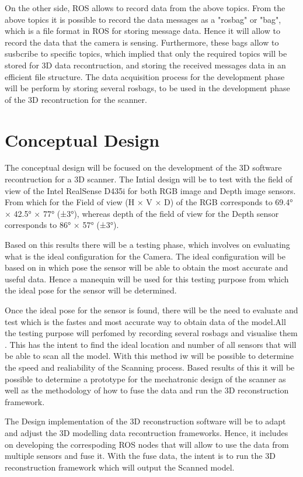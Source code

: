 \documentclass[12pt]{report}
\begin{document}
On the other side, ROS allows to record data from the above topics. From the above topics it is possible to record the data messages as a "rosbag" or "bag", which is a file format in ROS for storing message data. Hence it will allow to record the data that the camera is sensing. 
Furthermore, these bags allow to susbcribe to specific topics, which implied that only the required topics will be stored for 3D data recontruction, and storing the received messages data in an efficient file structure. 
The data acquisition process for the development phase will be perform by storing several rosbags, to be used in the development phase of the 3D recontruction for the scanner.

\section{Conceptual Design}
The conceptual design will be focused on the  development of the 3D software recontruction for a 3D scanner. 
The Intial design will be to test with the field of view of the Intel RealSense D435i for both RGB image and Depth image sensors. From which for the Field of view (H × V × D) of the RGB corresponds to 69.4° × 42.5° × 77° (±3°),
whereas depth of the field of view for the Depth sensor corresponds to 86° × 57° (±3°)\citep*{intelrealsense}.

Based on this results there will be a testing phase, which involves on evaluating what is the ideal configuration for the Camera. The ideal configuration will be based on in which pose the sensor will be able to obtain the most accurate and useful data. 
Hence a manequin will be used for this testing purpose from which the ideal pose for the sensor will be determined. 
\enlargethispage{\baselineskip}

Once the ideal pose for the sensor is found, there will be the need to evaluate and test which is the fastes and most accurate way to obtain data of the model.All the testing purpose will perfomed by recording several rosbags and visualise them .
This has the intent to find the ideal location and number of all sensors that will be able to scan all the model. With this method iw will be possible to determine the speed and realiability of the Scanning process. 
Based results of this it will be possible to determine a prototype for the mechatronic design of the scanner as well as the methodology of how to fuse the data and run the 3D reconstruction framework. 

The Design implementation of the 3D reconstruction software will be to adapt and adjust the 3D modelling data recontruction frameworks. Hence, it includes on developing the correspoding ROS nodes that will allow to use the data from multiple sensors and fuse it. 
With the fuse data, the intent is to run the 3D reconstruction framework which will output the Scanned model. 
\end{document}
